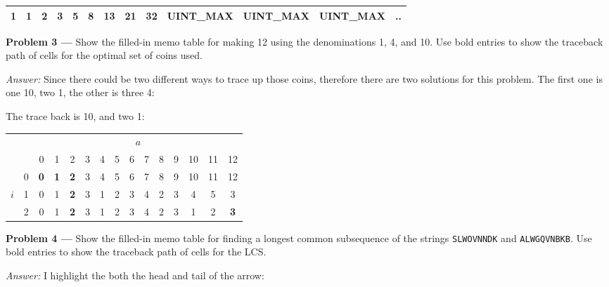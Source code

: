 \documentclass[11pt]{article}
\newcommand{\problem}[1]{\vspace*{2ex}\textbf{Problem #1 ---} }
\newcommand{\answer}{\emph{Answer: } }
\begin{document}
\begin{center}
\begin{tabular}{ |c|c|c|c|c|c|c|c|c|c|c|c|c|} 
 \hline
 1 & 1 & 2 & 3 & 5 & 8 & 13 & 21 & 32 & UINT\_MAX & UINT\_MAX & UINT\_MAX & ..\\ 
 \hline
\end{tabular}
\end{center}


\problem{3} Show the filled-in memo table for making
12\textcent{} using the denominations 1\textcent, 4\textcent, and
10\textcent. Use bold entries to show the traceback path of cells
for the optimal set of coins used.

\textit{Answer:} Since there could be two different ways to trace up those coins, therefore there are two solutions for this problem. The first one is one 10\textcent, two 1\textcent, the other is three 4\textcent $\colon$

The trace back is 10\textcent, and two 1\textcent $\colon$
\begin{center}
\begin{tabular}{cc|*{13}{c}}
    & \multicolumn{1}{c}{}  & \multicolumn{13}{c}{$a$} \\
    &   & 0 & 1 & 2 & 3 & 4 & 5 & 6 & 7 & 8 & 9 & 10 & 11 & 12 \\ \cline{2-15}
    & 0 & \textbf{0} & \textbf{1} & \textbf{2} & 3 & 4 & 5 & 6 & 7 & 8 & 9 & 10 & 11 & 12   \\
$i$ & 1 & 0 & 1 &\textbf{2} & 3 & 1 & 2 & 3 & 4 & 2 & 3 & 4  & 5  & 3  \\
    & 2 & 0 & 1 & \textbf{2} & 3 & 1 & 2 & 3 & 4 & 2 & 3 & 1  & 2  & \textbf{3}   \\
\end{tabular}
\end{center}



\problem{4} Show the filled-in memo table for finding a longest common
subsequence of the strings \verb=SLWOVNNDK= and \verb=ALWGQVNBKB=.
Use bold entries to show the traceback path of cells for the LCS.

\answer I highlight the both the head and tail of the arrow$\colon$
\end{document}
